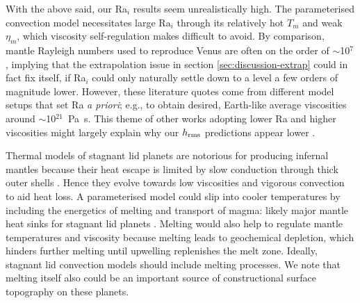 \documentclass[trackchanges]{aastex63}
\newcommand{\jr}[1]{\textit{\textcolor{blue}{{#1}}}}
\begin{document}
With the above said, our Ra$_i$ results seem unrealistically high. The parameterised convection model necessitates large Ra$_i$ through its relatively hot $T_m$ and weak $\eta_m$, which viscosity self-regulation makes difficult to avoid. By comparison, mantle Rayleigh numbers used to reproduce Venus are often on the order of $\sim$10$^7$ \citep[e.g.,][]{kiefer_geoid_1992, kiefer_geoid_1998, vezolainen_timing_2003, vezolainen_uplift_2004, pauer_modeling_2006, smrekar_constraints_2012, noack_coupling_2012, huang_constraints_2013}, implying that the extrapolation issue in section \ref{sec:discussion-extrap} could in fact fix itself, if Ra$_i$ could only naturally settle down to a level a few orders of magnitude lower. However, these literature quotes come from different model setups that set Ra \textit{a priori}; e.g., to obtain desired, Earth-like average viscosities around $\sim$10$^{21}$~Pa~s. This theme of other works adopting lower Ra and higher viscosities might largely explain why our $h_{\rm rms}$ predictions appear lower \citep[e.g.,][]{kiefer_geoid_1992, huang_constraints_2013}.





Thermal models of stagnant lid planets are notorious for producing infernal mantles because their heat escape is limited by slow conduction through thick outer shells \citep[e.g.,][]{driscoll_thermal_2014}. Hence they evolve towards low viscosities and vigorous convection to aid heat loss. A parameterised model could slip into cooler temperatures by including the energetics of melting and transport of magma: likely major mantle heat sinks for stagnant lid planets \citep{moore_heat-pipe_2017, lourenco_efficient_2018}. Melting would also help to regulate mantle temperatures and viscosity because melting leads to geochemical depletion, which hinders further melting until upwelling replenishes the melt zone. Ideally, stagnant lid convection models should include melting processes. We note that melting itself also could be an important source of constructional surface topography on these planets.
\end{document}
